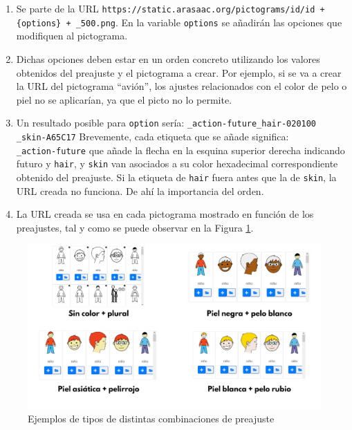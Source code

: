 \begin{enumerate}
	\item Se parte de la URL \texttt{https://static.arasaac.org/pictograms/id/id + \{options\} + \_500.png}. En la variable \texttt{options} se añadirán las opciones que modifiquen al pictograma.
	
	
	\item Dichas opciones deben estar  en un orden concreto utilizando los valores obtenidos del preajuste y el pictograma a crear. Por ejemplo, si se va a crear la URL del  pictograma “avión”, los ajustes relacionados con el color de pelo o piel no se aplicarían, ya que el picto no lo permite.
	 
	\item Un resultado posible para \texttt{option} sería: \texttt{\_action-future\_hair-020100 \_skin-A65C17} Brevemente, cada etiqueta que se añade significa: \\ \texttt{\_action-future} que añade la flecha en la esquina superior derecha indicando futuro y \texttt{hair}, y \texttt{skin} van asociados a su color hexadecimal correspondiente obtenido del preajuste. Si la etiqueta de \texttt{hair} fuera antes que la de \texttt{skin}, la URL creada no funciona. De ahí la importancia del orden.
	
	\item La URL creada se usa en cada pictograma mostrado en función de los preajustes, tal y como se puede observar en la Figura \ref{fig:buscarpictopreajuste}.
	
\end{enumerate}



\begin{figure}[h!]
	\centering
	\includegraphics[width=0.9\linewidth]{Imagenes/Bitmap/buscarPictoPreajuste}
	\caption{Ejemplos de tipos de distintas combinaciones de preajuste}
	\label{fig:buscarpictopreajuste}
\end{figure}



